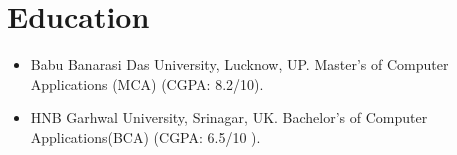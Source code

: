 \documentclass[a4paper,11pt]{article}
\newcommand{\resumeItem}[2]{
  \item{
    \textbf{#1}{\hspace{0.5mm}#2 \vspace{-0.5mm}}
  }
}
\newcommand{\resumeSubHeadingListStart}{\begin{itemize}[leftmargin=*,labelsep=1mm]}
\newcommand{\resumeSubHeadingListEnd}{\end{itemize}\vspace{0.5mm}}
\begin{document}
\section{Education}
\vspace{-0.4mm}
\resumeSubHeadingListStart
\item {Babu Banarasi Das University, Lucknow, UP.} { Master’s of Computer Applications (MCA) (CGPA: 8.2/10)}.
\item {HNB Garhwal University, Srinagar, UK.} {Bachelor's of Computer Applications(BCA) (CGPA: 6.5/10 )}.
\resumeSubHeadingListEnd






        
\end{document}
